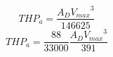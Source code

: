 \documentclass{article}
\begin{document}
\[
THP_a=\frac{A_D {V_{max}}^3}{146625}
\]
\[
THP_a=\frac{88}{33000}\frac{A_D {V_{max}}^3}{391}
\]
\end{document}
